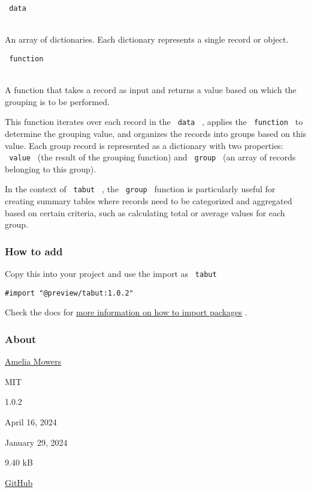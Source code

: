 \texttt{\ data\ }\strut \\
An array of dictionaries. Each dictionary represents a single record or
object.

\texttt{\ function\ }\strut \\
A function that takes a record as input and returns a value based on
which the grouping is to be performed.

This function iterates over each record in the \texttt{\ data\ } ,
applies the \texttt{\ function\ } to determine the grouping value, and
organizes the records into groups based on this value. Each group record
is represented as a dictionary with two properties: \texttt{\ value\ }
(the result of the grouping function) and \texttt{\ group\ } (an array
of records belonging to this group).

In the context of \texttt{\ tabut\ } , the \texttt{\ group\ } function
is particularly useful for creating summary tables where records need to
be categorized and aggregated based on certain criteria, such as
calculating total or average values for each group.

\subsubsection{How to add}\label{how-to-add}

Copy this into your project and use the import as \texttt{\ tabut\ }

\begin{verbatim}
#import "@preview/tabut:1.0.2"
\end{verbatim}



Check the docs for
\href{https://typst.app/docs/reference/scripting/\#packages}{more
information on how to import packages} .

\subsubsection{About}\label{about}

\begin{description}
\tightlist
\item[Author :]
\href{https://github.com/Amelia-Mowers}{Amelia Mowers}
\item[License:]
MIT
\item[Current version:]
1.0.2
\item[Last updated:]
April 16, 2024
\item[First released:]
January 29, 2024
\item[Archive size:]
9.40 kB
\href{https://packages.typst.org/preview/tabut-1.0.2.tar.gz}{\pandocbounded{}}
\item[Repository:]
\href{https://github.com/Amelia-Mowers/typst-tabut}{GitHub}
\end{description}


